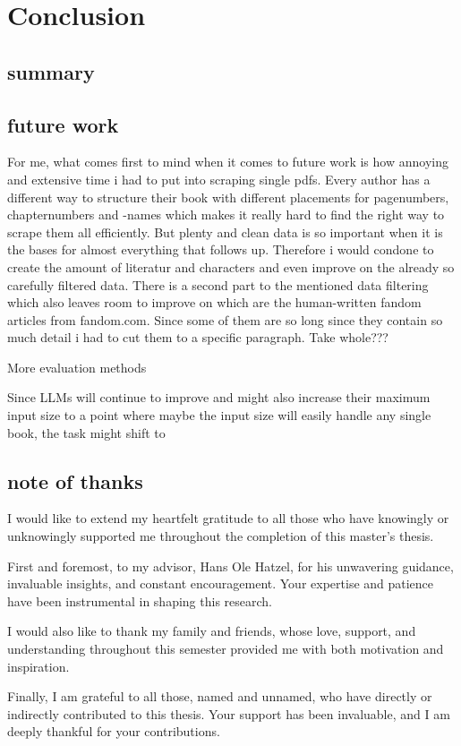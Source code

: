 \chapter{Conclusion}

\section{summary}
\section{future work}
For me, what comes first to mind when it comes to future work is how annoying and extensive time i had to put into scraping single pdfs. Every author has a different way to structure their book with different placements for pagenumbers, chapternumbers and -names which makes it really hard to find the right way to scrape them all efficiently. But plenty and clean data is so important when it is the bases for almost everything that follows up. Therefore i would condone to create the amount of literatur and characters and even improve on the already so carefully filtered data.
There is a second part to the mentioned data filtering which also leaves room to improve on which are the human-written fandom articles from fandom.com. Since some of them are so long since they contain so much detail i had to cut them to a specific paragraph. Take whole???

More evaluation methods

Since LLMs will continue to improve and might also increase their maximum input size to a point where maybe the input size will easily handle any single book, the task might shift to 

\section{note of thanks}
I would like to extend my heartfelt gratitude to all those who have knowingly or unknowingly supported me throughout the completion of this master's thesis.

First and foremost, to my advisor, Hans Ole Hatzel, for his unwavering guidance, invaluable insights, and constant encouragement. Your expertise and patience have been instrumental in shaping this research.

I would also like to thank my family and friends, whose love, support, and understanding throughout this semester provided me with both motivation and inspiration.


Finally, I am grateful to all those, named and unnamed, who have directly or indirectly contributed to this thesis. Your support has been invaluable, and I am deeply thankful for your contributions.
